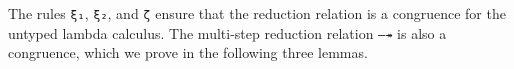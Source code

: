 The rules \texttt{ξ₁}, \texttt{ξ₂}, and \texttt{ζ} ensure that the
reduction relation is a congruence for the untyped lambda calculus. The
multi-step reduction relation \texttt{—↠} is also a congruence, which we
prove in the following three lemmas.

\begin{fence}
\begin{code}%
\>[0]\AgdaSpace{}%
\AgdaSymbol{:}\AgdaSpace{}%
\AgdaSpace{}%
\AgdaSymbol{\{}\AgdaSymbol{\}}\AgdaSpace{}%
\AgdaSymbol{\{}\AgdaSpace{}%
\AgdaSpace{}%
\AgdaSpace{}%
\AgdaSymbol{:}\AgdaSpace{}%
\AgdaSpace{}%
\AgdaSpace{}%
\AgdaSymbol{\}}\<%
\\
\>[0][@{}l@{\AgdaIndent{0}}]%
\>[9]%
\>[1669I]\AgdaSpace{}%
\AgdaSpace{}%
\<%
\\
\>[.][@{}l@{}]\<[1669I]%
\>[11]\AgdaComment{---------------}\<%
\\
%
\>[9]\AgdaSpace{}%
\AgdaSpace{}%
\AgdaSpace{}%
\AgdaSpace{}%
\AgdaSpace{}%
\AgdaSpace{}%
\AgdaSpace{}%
\<%
\\
\>[0]\AgdaSpace{}%
\AgdaSymbol{\{}\AgdaSymbol{\}\{}\AgdaSymbol{\}\{}\AgdaSymbol{\}\{}\AgdaSymbol{\}}\AgdaSpace{}%
\AgdaSymbol{(}\AgdaSpace{}%
\AgdaSymbol{)}\AgdaSpace{}%
\AgdaSymbol{=}\AgdaSpace{}%
\AgdaSpace{}%
\AgdaSpace{}%
\AgdaSpace{}%
\<%
\\
\>[0]\AgdaSpace{}%
\AgdaSymbol{\{}\AgdaSymbol{\}\{}\AgdaSymbol{\}\{}\AgdaSymbol{\}\{}\AgdaSymbol{\}}\AgdaSpace{}%
\AgdaSymbol{(}\AgdaSpace{}%
\AgdaSpace{}%
\AgdaSpace{}%
\AgdaSpace{}%
\AgdaSymbol{)}\AgdaSpace{}%
\AgdaSymbol{=}\AgdaSpace{}%
\AgdaSpace{}%
\AgdaSpace{}%
\AgdaSpace{}%
\AgdaSpace{}%
\AgdaSpace{}%
\AgdaSpace{}%
\AgdaSpace{}%
\AgdaSpace{}%
\<%
\end{code}
\end{fence}

